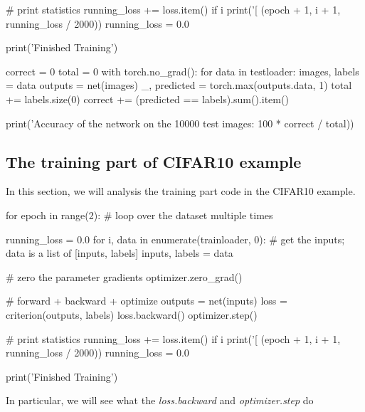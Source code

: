 \begin{python}
        # print statistics
        running_loss += loss.item()
        if i %
            print('[%
                  (epoch + 1, i + 1, running_loss / 2000))
            running_loss = 0.0

print('Finished Training')

correct = 0
total = 0
with torch.no_grad():
    for data in testloader:
        images, labels = data
        outputs = net(images)
        _, predicted = torch.max(outputs.data, 1)
        total += labels.size(0)
        correct += (predicted == labels).sum().item()

print('Accuracy of the network on the 10000 test images: %
    100 * correct / total))

\end{python}


\subsection{The training part of CIFAR10 example}
In this section, we will analysis the training part code in the CIFAR10 example. 
\begin{python}
for epoch in range(2):  # loop over the dataset multiple times

    running_loss = 0.0
    for i, data in enumerate(trainloader, 0):
        # get the inputs; data is a list of [inputs, labels]
        inputs, labels = data

        # zero the parameter gradients
        optimizer.zero_grad()

        # forward + backward + optimize
        outputs = net(inputs)
        loss = criterion(outputs, labels)
        loss.backward()
        optimizer.step()

        # print statistics
        running_loss += loss.item()
        if i %
            print('[%
                  (epoch + 1, i + 1, running_loss / 2000))
            running_loss = 0.0

print('Finished Training')
\end{python}
In particular, we will see what the \emph{loss.backward} and \emph{optimizer.step} do
